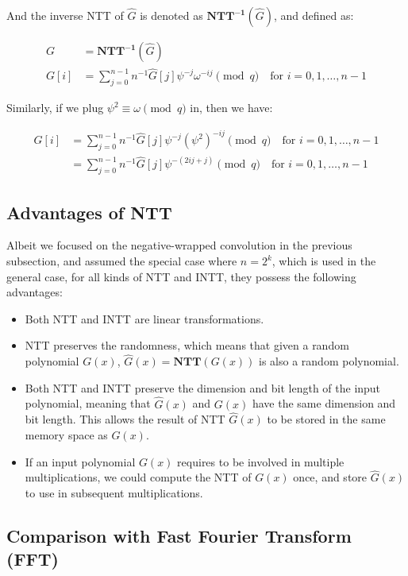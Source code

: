 \documentclass[12pt]{article}
\begin{document}
And the inverse NTT of $\hat{G}$ is denoted as $\mathbf{NTT^{-1}}(\hat{G})$, 
and defined as:

\begin{align*}
    G &= \mathbf{NTT^{-1}}(\hat{G}) \\
    G[i] &= \sum_{j = 0}^{n - 1} n^{-1} \hat{G}[j] \psi^{-j}\omega^{-i j} \pmod{q} \quad \text{for } i = 0, 1, \ldots, n-1
\end{align*}

Similarly, if we plug $\psi^2 \equiv \omega \pmod{q}$ in, then we have:

\begin{align*}
    G[i] 
    &= \sum_{j = 0}^{n - 1} n^{-1} \hat{G}[j] \psi^{- j}(\psi^2)^{-i j} \pmod{q} \quad \text{for } i = 0, 1, \ldots, n-1 \\
    &= \sum_{j = 0}^{n - 1} n^{-1} \hat{G}[j] \psi^{-(2ij + j)} \pmod{q} \quad \text{for } i = 0, 1, \ldots, n-1
\end{align*}

\subsection{Advantages of NTT}

Albeit we focused on the negative-wrapped convolution in the previous subsection, 
and assumed the special case where $n = 2^k$, which is used in the general case, 
for all kinds of NTT and INTT, 
they possess the following advantages:

\begin{itemize}
    \item Both NTT and INTT are linear transformations.
    \item NTT preserves the randomness, which means that given a random polynomial $G(x)$, 
    $\hat{G}(x) = \mathbf{NTT}(G(x))$ is also a random polynomial.
    \item Both NTT and INTT preserve the dimension and bit length of the input polynomial, 
    meaning that $\hat{G}(x)$ and $G(x)$ have the same dimension and bit length.
    This allows the result of NTT $\hat{G}(x)$ to be stored in the same memory space as $G(x)$.
    \item If an input polynomial $G(x)$ requires to be involved in multiple multiplications, 
    we could compute the NTT of $G(x)$ once, and store $\hat{G}(x)$ to use in subsequent multiplications.
\end{itemize}
\cite[p.~5]{survey}

\subsection{Comparison with Fast Fourier Transform (FFT)}
\end{document}
